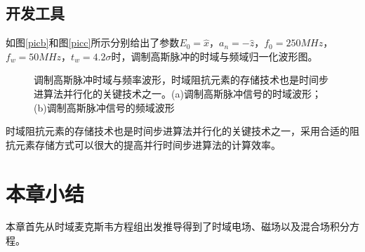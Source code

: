 \subsection{开发工具}


如图\ref{picb}和图\ref{picc}所示分别给出了参数$E_0=\hat{x}$，$a_n=-\hat{z}$，$f_0=250MHz$，$f_w=50MHz$，$t_w=4.2\sigma$时，调制高斯脉冲的时域与频域归一化波形图。

\begin{figure}[h]
\caption{调制高斯脉冲时域与频率波形，时域阻抗元素的存储技术也是时间步进算法并行化的关键技术之一。(a)调制高斯脉冲信号的时域波形；(b)调制高斯脉冲信号的频域波形}
\label{fig1}
\end{figure}

时域阻抗元素的存储技术也是时间步进算法并行化的关键技术之一，采用合适的阻抗元素存储方式可以很大的提高并行时间步进算法的计算效率。

\section{本章小结}
本章首先从时域麦克斯韦方程组出发推导得到了时域电场、磁场以及混合场积分方程。

